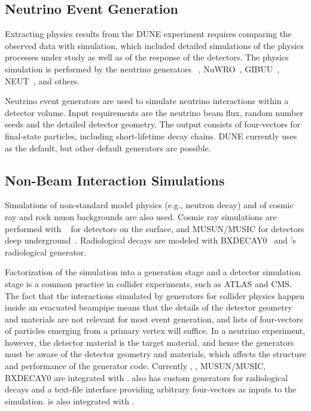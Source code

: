 \documentclass[../main-v1.tex]{subfiles}
\begin{document}
\subsection{Neutrino Event Generation}

Extracting physics results from the DUNE experiment requires comparing the observed data with simulation, 
which included detailed simulations 
of the physics processes under study as well as of the response of the detectors.  The physics simulation is performed by the neutrino generators ~\cite{Andreopoulos:2009rq}, NuWRO~\cite{NuWro2012}, GIBUU~\cite{Gallmeister:2016dnq}, NEUT~\cite{Hayato:2009zz}, and others. 

Neutrino event generators are used to simulate neutrino interactions within a detector volume.  Input requirements are the neutrino beam flux, random number seeds and the detailed detector geometry. The output consists of four-vectors for final-state particles, including short-lifetime decay chains.  DUNE currently uses ~\cite{GENIE} as the default, but other default generators are possible. 

\subsection{Non-Beam Interaction Simulations}
Simulations of non-standard model physics (e.g., neutron decay) and of cosmic ray and rock muon backgrounds are also used.  Cosmic ray simulations are performed with ~\cite{Wentz:2003bp,Dembinski:2020wrp} for detectors on the surface, and MUSUN/MUSIC for detectors deep underground~\cite{Kudryavtsev:2008qh,LBNEDOCDB9673}.  Radiological decays are modeled with BXDECAY0~\cite{Ponkratenko:2000um} and 's  radiological generator.

Factorization of the simulation into a generation stage and a detector simulation stage is a common practice 
in collider experiments, such as ATLAS and CMS.  The fact that the interactions simulated by generators for collider physics happen inside an evacuated beampipe means that the details of the detector geometry and materials are not relevant for most event generation, and lists of four-vectors of particles emerging from a primary vertex will suffice.  In a neutrino experiment, however, the detector material is the target material, and hence the generators must be aware of the detector geometry and materials, which affects the structure and performance of the generator code.  Currently , , MUSUN/MUSIC, BXDECAY0 are integrated with .   also has custom generators for radiological decays and a text-file interface providing arbitrary four-vectors as inputs to the simulation.  is also integrated with .
\end{document}
